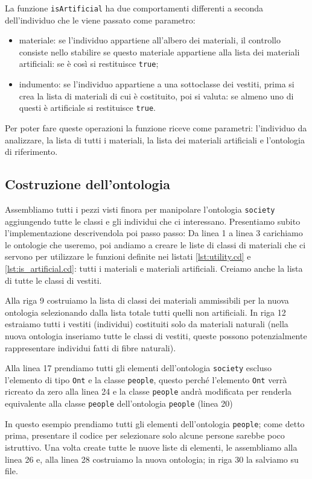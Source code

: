 La funzione \verb|isArtificial| ha due comportamenti differenti a seconda dell'individuo che le viene passato come parametro:
\begin{itemize}
	\item materiale: se l'individuo appartiene all'albero dei materiali, il controllo consiste nello stabilire se questo materiale appartiene alla lista dei materiali artificiali: se è così si restituisce \verb|true|;
	\item indumento: se l'individuo appartiene a una sottoclasse dei vestiti, prima si crea la lista di materiali di cui è costituito, poi si valuta: se almeno uno di questi è artificiale si restituisce \verb|true|.
\end{itemize}
Per poter fare queste operazioni la funzione riceve come parametri: l'individuo da analizzare, la lista di tutti i materiali, la lista dei materiali artificiali e  l'ontologia di riferimento.
\subsection{Costruzione dell'ontologia}
Assembliamo tutti i pezzi visti finora per manipolare l'ontologia \verb|society| aggiungendo tutte le classi e gli individui che ci interessano. Presentiamo subito l'implementazione descrivendola poi passo passo:
Da linea 1 a linea 3 carichiamo le ontologie che useremo, poi andiamo a creare le liste di classi di materiali che ci servono per utilizzare le funzioni definite nei listati \ref{lst:utility.cd} e \ref{lst:is_artificial.cd}: tutti i materiali e materiali artificiali. Creiamo anche la lista di tutte le classi di vestiti.

Alla riga 9 costruiamo la lista di classi dei materiali ammissibili per la nuova ontologia selezionando dalla lista totale tutti quelli non artificiali. In riga 12 estraiamo tutti i vestiti (individui) costituiti solo da materiali naturali (nella nuova ontologia inseriamo tutte le classi di vestiti, queste possono potenzialmente rappresentare individui fatti di fibre naturali).

Alla linea 17 prendiamo tutti gli elementi dell'ontologia \verb|society| escluso l'elemento di tipo \verb|Ont| e la classe \verb|people|, questo perché l'elemento \verb|Ont| verrà ricreato da zero alla linea 24 e la classe \verb|people| andrà modificata per renderla equivalente alla classe \verb|people| dell'ontologia \verb|people| (linea 20)

In questo esempio prendiamo tutti gli elementi dell'ontologia \verb|people|; come detto prima, presentare il codice per selezionare solo alcune persone sarebbe poco istruttivo. Una volta create tutte le nuove liste di elementi, le assembliamo alla linea 26 e, alla linea 28 costruiamo la nuova ontologia; in riga 30 la salviamo su file.
